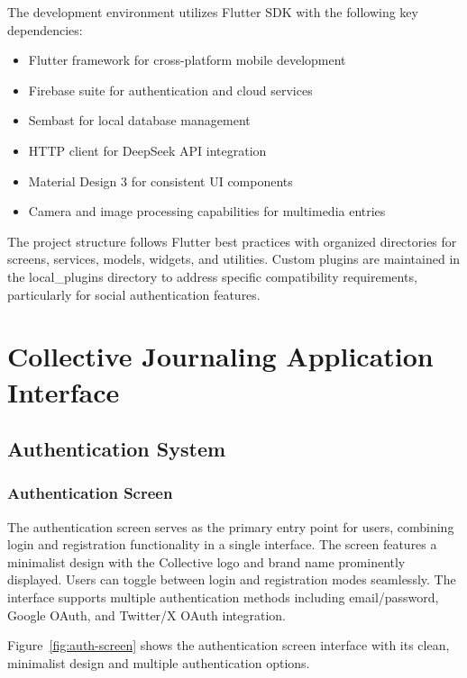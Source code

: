 The development environment utilizes Flutter SDK with the following key dependencies:
\begin{itemize}
    \item Flutter framework for cross-platform mobile development
    \item Firebase suite for authentication and cloud services
    \item Sembast for local database management
    \item HTTP client for DeepSeek API integration
    \item Material Design 3 for consistent UI components
    \item Camera and image processing capabilities for multimedia entries
\end{itemize}

The project structure follows Flutter best practices with organized directories for screens, services, models, widgets, and utilities. Custom plugins are maintained in the local\_plugins directory to address specific compatibility requirements, particularly for social authentication features.

\section{Collective Journaling Application Interface}

\subsection{Authentication System}

\subsubsection{Authentication Screen}

The authentication screen serves as the primary entry point for users, combining login and registration functionality in a single interface. The screen features a minimalist design with the Collective logo and brand name prominently displayed. Users can toggle between login and registration modes seamlessly. The interface supports multiple authentication methods including email/password, Google OAuth, and Twitter/X OAuth integration.

Figure~\ref{fig:auth-screen} shows the authentication screen interface with its clean, minimalist design and multiple authentication options.



